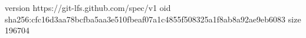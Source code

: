 version https://git-lfs.github.com/spec/v1
oid sha256:cfc16d3aa78bcfba5aa3e510fbeaf07a1c4855f508325a1f8ab8a92ae9eb6083
size 196704
